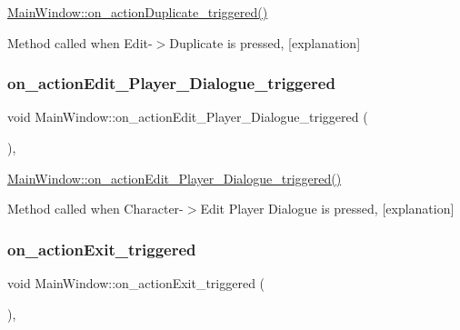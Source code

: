 \hyperlink{class_main_window_af5060bd55fe1e9a7196be8a2dab1622e}{Main\+Window\+::on\+\_\+action\+Duplicate\+\_\+triggered()} 

Method called when Edit-\/$>$Duplicate is pressed, \mbox{[}explanation\mbox{]} \mbox{\label{class_main_window_a09845ae686236e352e5933f1f701cbf0}} 
\subsubsection{\texorpdfstring{on\+\_\+action\+Edit\+\_\+\+Player\+\_\+\+Dialogue\+\_\+triggered}{on\_actionEdit\_Player\_Dialogue\_triggered}}
{\footnotesize\ttfamily void Main\+Window\+::on\+\_\+action\+Edit\+\_\+\+Player\+\_\+\+Dialogue\+\_\+triggered (\begin{DoxyParamCaption}{ }\end{DoxyParamCaption})\hspace{0.3cm}{\ttfamily [private]}, {\ttfamily [slot]}}



\hyperlink{class_main_window_a09845ae686236e352e5933f1f701cbf0}{Main\+Window\+::on\+\_\+action\+Edit\+\_\+\+Player\+\_\+\+Dialogue\+\_\+triggered()} 

Method called when Character-\/$>$Edit Player Dialogue is pressed, \mbox{[}explanation\mbox{]} \mbox{\label{class_main_window_ab4487c4b02224acd4a0193d38b704ddb}} 
\subsubsection{\texorpdfstring{on\+\_\+action\+Exit\+\_\+triggered}{on\_actionExit\_triggered}}
{\footnotesize\ttfamily void Main\+Window\+::on\+\_\+action\+Exit\+\_\+triggered (\begin{DoxyParamCaption}{ }\end{DoxyParamCaption})\hspace{0.3cm}{\ttfamily [private]}, {\ttfamily [slot]}}



